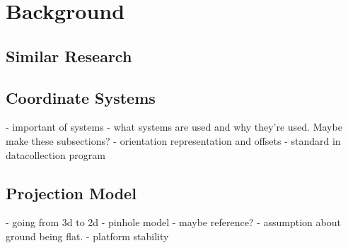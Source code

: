 
\cleardoublepage

\chapter{Background}
\label{background}

\section{Similar Research}


\section{Coordinate Systems}

  - important of systems
  - what systems are used and why they're used. Maybe make these subsections?
  - orientation representation and offsets - standard in datacollection program

\section{Projection Model}
 
 - going from 3d to 2d
 - pinhole model - maybe reference?
 - assumption about ground being flat. 
 - platform stability
